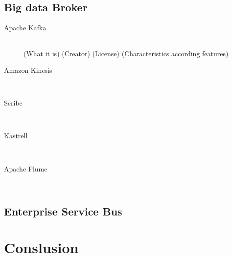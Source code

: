 \subsection{Big data Broker}
\begin{description}
    \item [Apache Kafka] \hfill \\
        { (What it is) (Creator) (License) (Characteristics according features) }
    \item [Amazon Kinesis] \hfill \\
    {}
    \item [Scribe] \hfill \\
    {}
    \item [Kastrell] \hfill \\
    {}
    \item [Apache Flume] \hfill \\
    {}
\end{description}

\subsection{Enterprise Service Bus}


\section{Conslusion}

